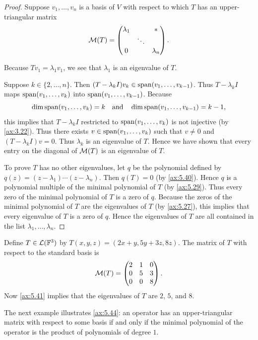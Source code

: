 \begin{proof}
Suppose $v_1,\dots,v_n$ is a basis of $V$ with respect to which $T$ has an
upper-triangular matrix
\[ \mathcal{M}(T) = \begin{pmatrix} \lambda_1 & & *\\ & \ddots & \\ 0 & & \lambda_n
   \end{pmatrix}. \]

Because $Tv_1=\lambda_1v_1$, we see that $\lambda_1$ is an eigenvalue of $T$.

Suppose $k\in\{2,\dots,n\}$. Then $(T-\lambda_kI)v_k\in\operatorname{span}(v_1,\dots,v_{k-1})$.
Thus $T-\lambda_kI$ maps $\operatorname{span}(v_1,\dots,v_k)$ into $\operatorname{span}(v_1,\dots,v_{k-1})$.
Because
\[ \operatorname{dim}\operatorname{span}(v_1,\dots,v_k)=k \quad\text{and}\quad
   \operatorname{dim}\operatorname{span}(v_1,\dots,v_{k-1})=k-1, \]
this implies that $T-\lambda_kI$ restricted to $\operatorname{span}(v_1,\dots,v_k)$ is not
injective (by \ref{ax:3.22}). Thus there exists $v\in\operatorname{span}(v_1,\dots,v_k)$ such
that $v\ne0$ and $(T-\lambda_kI)v=0$. Thus $\lambda_k$ is an eigenvalue of $T$.
Hence we have shown that every entry on the diagonal of $\mathcal{M}(T)$ is an
eigenvalue of $T$.

To prove $T$ has no other eigenvalues, let $q$ be the polynomial defined by
$q(z)=(z-\lambda_1)\cdots(z-\lambda_n)$. Then $q(T)=0$ (by \ref{ax:5.40}). Hence
$q$ is a polynomial multiple of the minimal polynomial of $T$ (by
\ref{ax:5.29}). Thus every zero of the minimal polynomial of $T$ is a zero of
$q$. Because the zeros of the minimal polynomial of $T$ are the eigenvalues of
$T$ (by \ref{ax:5.27}), this implies that every eigenvalue of $T$ is a zero of
$q$. Hence the eigenvalues of $T$ are all contained in the list
$\lambda_1,\dots,\lambda_n$.
\end{proof}

\begin{example}\label{ax:5.42}
Define $T\in\mathcal{L}(\mathbb{F}^3)$ by $T(x,y,z)=(2x+y,5y+3z,8z)$. The matrix of $T$ with
respect to the standard basis is
\[ \mathcal{M}(T) = \begin{pmatrix} 2&1&0\\ 0&5&3\\ 0&0&8 \end{pmatrix}. \]
Now \ref{ax:5.41} implies that the eigenvalues of $T$ are $2$, $5$, and $8$.
\end{example}

The next example illustrates \ref{ax:5.44}: an operator has an upper-triangular
matrix with respect to some basis if and only if the minimal polynomial of the
operator is the product of polynomials of degree $1$.


